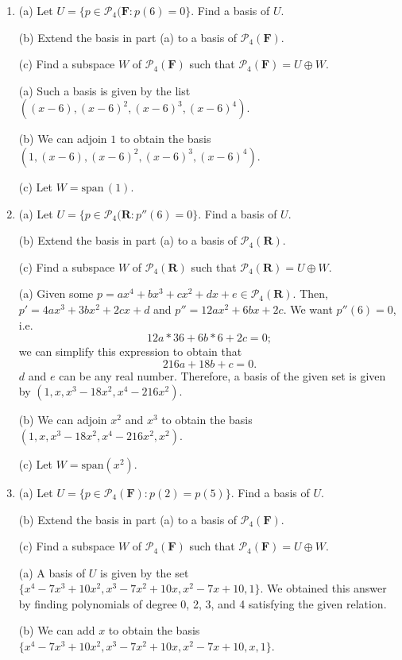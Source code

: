 \documentclass{book}
\begin{document}
\begin{enumerate}
\item (a) Let \(U=\{p \in \mathcal{P}_4(\textbf{F}: p(6)=0\}\).  Find a basis of \(U\).

(b) Extend the basis in part (a) to a basis of \(\mathcal{P}_4(\textbf{F})\).

(c) Find a subspace \(W\) of \(\mathcal{P}_4(\textbf{F})\) such that \(\mathcal{P}_4(\textbf{F})=U \oplus W\).

(a) Such a basis is given by the list \(((x-6),(x-6)^2,(x-6)^3,(x-6)^4)\).

(b) We can adjoin \(1\) to obtain the basis \((1, (x-6),(x-6)^2,(x-6)^3,(x-6)^4)\).

(c) Let \(W=\textrm{span} \, (1)\).

\item (a) Let \(U=\{p \in \mathcal{P}_4(\textbf{R}: p''(6)=0\}\).  Find a basis of \(U\).

(b) Extend the basis in part (a) to a basis of \(\mathcal{P}_4(\textbf{R})\).

(c) Find a subspace \(W\) of \(\mathcal{P}_4(\textbf{R})\) such that \(\mathcal{P}_4(\textbf{R})=U \oplus W\).

(a) Given some \(p = ax^4+bx^3+cx^2+dx+e \in \mathcal{P}_4(\textbf{R})\).  Then, \(p'=4ax^3+3bx^2+2cx+d\) and \(p''=12ax^2+6bx+2c\).  We want \(p''(6)=0\), i.e. \[12a*36+6b*6+2c=0;\] we can simplify this expression to obtain that \[216a+18b+c=0.\] \(d\) and \(e\) can be any real number.  Therefore, a basis of the given set is given by \((1,x,x^3-18x^2,x^4-216x^2)\).

(b) We can adjoin \(x^2\) and \(x^3\) to obtain the basis \((1,x,x^3-18x^2,x^4-216x^2,x^2)\).

(c) Let \(W=\textrm{span}(x^2)\).

\item (a) Let \(U=\{p \in \mathcal{P}_4(\textbf{F}): p(2)=p(5)\}\).  Find a basis of \(U\).

(b) Extend the basis in part (a) to a basis of \(\mathcal{P}_4(\textbf{F})\).

(c) Find a subspace \(W\) of \(\mathcal{P}_4(\textbf{F})\) such that \(\mathcal{P}_4(\textbf{F})=U \oplus W\).

(a) A basis of \(U\) is given by the set \(\{x^4-7x^3+10x^2,x^3-7x^2+10x,x^2-7x+10,1\}\).  We obtained this answer by finding polynomials of degree 0, 2, 3, and 4 satisfying the given relation.

(b) We can add \(x\) to obtain the basis \(\{x^4-7x^3+10x^2,x^3-7x^2+10x,x^2-7x+10,x,1\}\).


\end{enumerate}
\end{document}
